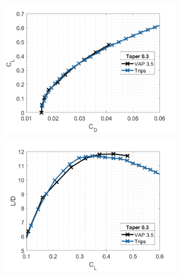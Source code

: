 \begin{figure}[H]
     \centering
     \begin{subfigure}[b]{0.45\textwidth}
         \centering
         \includegraphics[width=\textwidth]{05_Results/Figs/VAP/genMAV/taper5a.png}

     \end{subfigure}
     \hfill
     \begin{subfigure}[b]{0.45\textwidth}
         \centering
         \includegraphics[width=\textwidth]{05_Results/Figs/VAP/genMAV/taper5b.png}
      
     \end{subfigure}
     \hfill

        
\end{figure}



